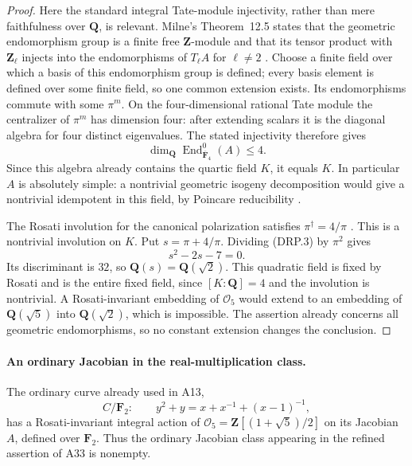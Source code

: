 \documentclass[11pt,a4paper]{article}
\begin{document}
\begin{proof}
Here the standard integral Tate-module injectivity, rather than mere
faithfulness over $\mathbf Q$, is relevant. Milne's
Theorem~12.5 states that the geometric endomorphism group is a finite
free $\mathbf Z$-module and that its tensor product with
$\mathbf Z_\ell$ injects into the endomorphisms of $T_\ell A$
for $\ell\ne2$ \cite[Theorem~12.5, pp.~21--22]{MilneAV}.
Choose a finite field over which a basis of this endomorphism group
is defined; every basis element is defined over some finite field,
so one common extension exists. Its endomorphisms commute with some
$\pi^m$. On the four-dimensional rational Tate module the
centralizer of $\pi^m$ has dimension four: after extending scalars
it is the diagonal algebra for four distinct eigenvalues. The stated
injectivity therefore gives
\[
 \dim_{\mathbf Q}\operatorname{End}^0_{\overline{\mathbf F}_4}(A)
       \le4.
\]
Since this algebra already contains the quartic field $K$, it equals
$K$. In particular $A$ is absolutely simple: a nontrivial geometric
isogeny decomposition would give a nontrivial idempotent in this
field, by Poincare reducibility
\cite[Proposition~12.1, p.~19]{MilneAV}.

The Rosati involution for the canonical polarization satisfies
$\pi^\dagger=4/\pi$ \cite[Lemma~19.2, p.~41]{MilneAV}.
This is a nontrivial involution on $K$. Put $s=\pi+4/\pi$.
Dividing (DRP.3) by $\pi^2$ gives
\[
                         s^2-2s-7=0.
 \tag{DRP.5}
\]
Its discriminant is $32$, so $\mathbf Q(s)=\mathbf Q(\sqrt2)$.
This quadratic field is fixed by Rosati and is the entire fixed
field, since $[K:\mathbf Q]=4$ and the involution is nontrivial.
A Rosati-invariant embedding of $\mathcal O_5$ would extend to an
embedding of $\mathbf Q(\sqrt5)$ into $\mathbf Q(\sqrt2)$,
which is impossible. The assertion already concerns all geometric
endomorphisms, so no constant extension changes the conclusion.
\end{proof}


\paragraph{An ordinary Jacobian in the real-multiplication class.}
The ordinary curve already used in A13,
\[
 C/\mathbf F_2:\qquad y^2+y=x+x^{-1}+(x-1)^{-1},
 \tag{RME.1}
\]
has a Rosati-invariant integral action of
$\mathcal O_5=\mathbf Z[(1+\sqrt5)/2]$ on its Jacobian $A$,
defined over $\mathbf F_2$. Thus the ordinary Jacobian class
appearing in the refined assertion of A33 is nonempty.
\end{document}
